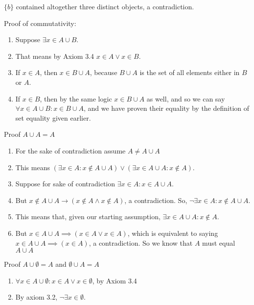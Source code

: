 \documentclass{article}
\begin{document}
\begin{enumerate}
\begin{enumerate}
                    $\{b\}$ contained altogether three distinct objects, a contradiction.
            \end{enumerate}
            Proof of commutativity:
            \begin{enumerate}
                \item Suppose $\exists x \in A \cup B$. 
                \item That means by Axiom 3.4 $x \in A \lor x \in B$. 
                \item If $x \in A$, then $x \in B \cup A$, because $B \cup A$
                    is the set of all elements either in $B$ or $A$.  
                \item If $x \in B$, then by the same logic $x \in B \cup A$ as
                    well, and so we can say $\forall x \in A \cup B: x \in B
                    \cup A$, and we have proven their equality by the
                    definition of set equality given earlier.
            \end{enumerate}
            Proof $A \cup A = A$
            \begin{enumerate}
                \item For the sake of contradiction assume $A \neq A \cup A$
                \item This means $(\exists x \in A: x \notin A \cup A) \lor
                    (\exists x \in A \cup A: x \notin A)$.
                \item Suppose for sake of contradiction $\exists x \in A: x \in A \cup A$.
                \item But $x \notin A \cup A \rightarrow (x \notin A \land x
                    \notin A)$, a contradiction. So, $\neg\exists x \in A: x \notin A \cup A$. 
                \item This means that, given our starting assumption, $\exists x \in A \cup A: x \notin A$.
                \item But $x \in A \cup A \implies (x \in A \lor x \in A)$,
                    which is equivalent to saying $x \in A \cup A \implies (x
                    \in A)$, a contradiction. So we know that $A$ must equal $A
                    \cup A$
            \end{enumerate}
            Proof $A \cup \emptyset = A$ and $\emptyset \cup A = A$
            \begin{enumerate}
                \item $\forall x \in A \cup \emptyset: x \in A \lor x \in \emptyset$, by Axiom 3.4
                \item By axiom 3.2, $\neg\exists x \in \emptyset$.

\end{enumerate}
\end{enumerate}
\end{document}
